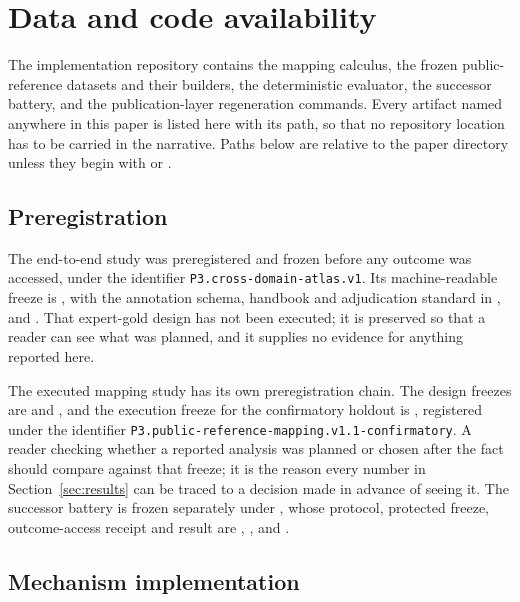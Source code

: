 \section{Data and code availability}
\label{sec:availability}

The implementation repository contains the mapping calculus, the frozen
public-reference datasets and their builders, the deterministic evaluator, the
successor battery, and the publication-layer regeneration commands. Every
artifact named anywhere in this paper is listed here with its path, so that no
repository location has to be carried in the narrative. Paths below are
relative to the paper directory unless they begin with  or
.

\subsection{Preregistration}

The end-to-end study was preregistered and frozen before any outcome was
accessed, under the identifier \texttt{P3.cross-domain-atlas.v1}. Its
machine-readable freeze is , with the
annotation schema, handbook and adjudication standard in
,
 and
. That expert-gold design has not been
executed; it is preserved so that a reader can see what was planned, and it
supplies no evidence for anything reported here.

The executed mapping study has its own preregistration chain. The design
freezes are  and
, and the execution freeze
for the confirmatory holdout is
, registered
under the identifier \texttt{P3.public-reference-mapping.v1.1-confirmatory}. A
reader checking whether a reported analysis was planned or chosen after the
fact should compare against that freeze; it is the reason every number in
Section~\ref{sec:results} can be traced to a decision made in advance of
seeing it. The successor battery is frozen separately under
, whose protocol, protected freeze,
outcome-access receipt and result are ,
, 
and .

\subsection{Mechanism implementation}

